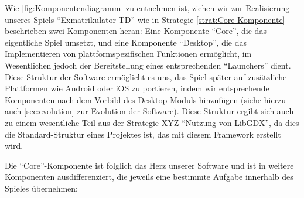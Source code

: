 \documentclass[enabledeprecatedfontcommands,fontsize=12pt,paper=a4,twoside,parskip=half]{scrartcl}
\begin{document}
Wie \autoref{fig:Komponentendiagramm} zu entnehmen ist, ziehen wir zur Realisierung unseres Spiels \enquote{Exmatrikulator TD} wie in Strategie \ref{strat:Core-Komponente} beschrieben zwei Komponenten heran: Eine Komponente \enquote{Core}, die das eigentliche Spiel umsetzt, und eine Komponente \enquote{Desktop}, die das Implementieren von plattformspezifischen Funktionen ermöglicht, im Wesentlichen jedoch der Bereitstellung eines entsprechenden \enquote{Launchers} dient. Diese Struktur der Software ermöglicht es uns, das Spiel später auf zusätzliche Plattformen wie Android oder iOS zu portieren, indem wir entsprechende Komponenten nach dem Vorbild des Desktop-Moduls hinzufügen (siehe hierzu auch \autoref{sec:evolution} zur Evolution der Software). Diese Struktur ergibt sich auch zu einem wesentliche Teil aus der Strategie XYZ \enquote{Nutzung von LibGDX}, da dies die Standard-Struktur eines Projektes ist, das mit diesem Framework erstellt wird.

Die \enquote{Core}-Komponente ist folglich das Herz unserer Software und ist in weitere Komponenten ausdifferenziert, die jeweils eine bestimmte Aufgabe innerhalb des Spieles übernehmen:
\end{document}
